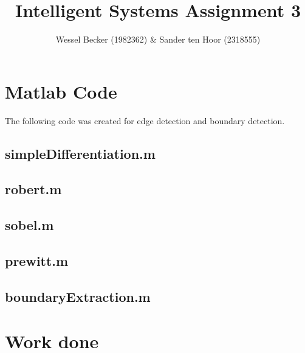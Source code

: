 \documentclass[10pt,a4paper]{article}
\begin{document}
\title{Intelligent Systems Assignment 3}
\author{Wessel Becker (1982362) \& Sander ten Hoor (2318555)}
\maketitle

\section{Matlab Code}
The following code was created for edge detection and boundary detection.

\subsection{simpleDifferentiation.m}


\subsection{robert.m}


\subsection{sobel.m}


\subsection{prewitt.m}


%

\subsection{boundaryExtraction.m}


\section{Work done}
\end{document}

